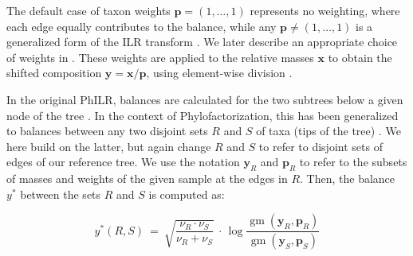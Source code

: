 
The default case of taxon weights $\bm{p} = ( 1, \ldots, 1 )$ represents no weighting,
where each edge equally contributes to the balance,
while any $\bm{p} \neq ( 1, \ldots, 1 )$ is a generalized form of the ILR transform \cite{Silverman2017}.
We later describe an appropriate choice of weights
in .
These weights are applied to the relative masses $\bm{x}$ to obtain the shifted composition $\bm{y} = \bm{x} / \bm{p}$,
using element-wise division \cite{Egozcue2016}.

In the original PhILR, balances are calculated for the two subtrees below a given node of the tree \cite{Silverman2017}.
In the context of Phylofactorization, this has been generalized
to balances between any two disjoint sets $R$ and $S$ of taxa (tips of the tree) \cite{Washburne2017a}.
We here build on the latter, but again change $R$ and $S$ to refer to disjoint sets of edges of our reference tree.
We use the notation $\bm{y}_R$ and $\bm{p}_R$ to refer
to the subsets of masses and weights of the given sample at the edges in $R$.
Then, the balance $y^*$ between the sets $R$ and $S$ is computed as:

\begin{equation}
    \label{ch:Balances:sec:Methods:eq:Balance}
    y^*( R, S ) ~=~ \sqrt{ \frac{ \nu_R \cdot \nu_S }{ \nu_R + \nu_S }} ~\cdot\,
                \log \frac{ \operatorname{gm}( \bm{y}_R, \bm{p}_{R} ) }{ \operatorname{gm}( \bm{y}_S, \bm{p}_{S} ) }
\end{equation}

